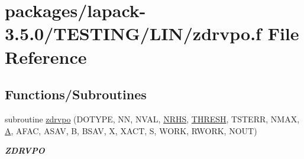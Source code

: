 \hypertarget{zdrvpo_8f}{}\section{packages/lapack-\/3.5.0/\+T\+E\+S\+T\+I\+N\+G/\+L\+I\+N/zdrvpo.f File Reference}
\label{zdrvpo_8f}
\subsection*{Functions/\+Subroutines}
\begin{DoxyCompactItemize}
\item 
subroutine \hyperlink{group__complex16__lin_gab2fad22f8c643c5137f11939c9b9c71a}{zdrvpo} (D\+O\+T\+Y\+P\+E, N\+N, N\+V\+A\+L, \hyperlink{example__user_8c_aa0138da002ce2a90360df2f521eb3198}{N\+R\+H\+S}, \hyperlink{zlaqgs_8c_a0656018abfc9fa2821827415f5d5ea57}{T\+H\+R\+E\+S\+H}, T\+S\+T\+E\+R\+R, N\+M\+A\+X, \hyperlink{classA}{A}, A\+F\+A\+C, A\+S\+A\+V, B, B\+S\+A\+V, X, X\+A\+C\+T, S, W\+O\+R\+K, R\+W\+O\+R\+K, N\+O\+U\+T)
\begin{DoxyCompactList}\small\item\em {\bfseries Z\+D\+R\+V\+P\+O} \end{DoxyCompactList}\end{DoxyCompactItemize}

